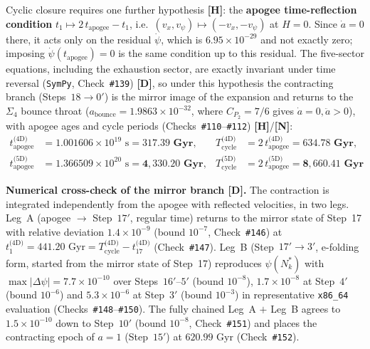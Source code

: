 \documentclass[11pt,a4paper]{article}
\newcommand{\catD}{\textbf{\textcolor{blue!75!black}{[D]}}}
\newcommand{\catH}{\textbf{\textcolor{orange!85!black}{[H]}}}
\newcommand{\catN}{\textbf{\textcolor{teal!75!black}{[N]}}}
\theoremstyle{plain}
\theoremstyle{definition}
\theoremstyle{remark}
\numberwithin{equation}{section}
\begin{document}
\begin{enumerate}
  Cyclic closure requires one further hypothesis \catH: the \textbf{apogee time-reflection condition} $t_1 \mapsto 2\,t_{\text{apogee}} - t_1$, i.e.\ $(v_x, v_{\psi}) \mapsto (-v_x, -v_{\psi})$ at $H = 0$. Since $\dot{a} = 0$ there, it acts only on the residual $\dot{\psi}$, which is $6.95 \times 10^{-29}$ and not exactly zero; imposing $\dot{\psi}(t_{\text{apogee}}) = 0$ is the same condition up to this residual. The five-sector equations, including the exhaustion sector, are exactly invariant under time reversal (\texttt{SymPy}, Check~\texttt{\#139}) \catD, so under this hypothesis the contracting branch (Steps~$18 \to 0'$) is the mirror image of the expansion and returns to the $\Sigma_4$ bounce throat ($a_{\text{bounce}} = 1.9863 \times 10^{-32}$, where $C_{P_2} = 7/6$ gives $\dot{a} = 0, \ddot{a} > 0$), with apogee ages and cycle periods (Checks~\texttt{\#110}--\texttt{\#112}) \catH/\catN:
  \begin{align}
    t_{\text{apogee}}^{\text{(4D)}} &= 1.001606 \times 10^{19}\text{ s} = \mathbf{317.39\text{ Gyr}}, & T_{\text{cycle}}^{\text{(4D)}} &= 2\,t_{\text{apogee}}^{\text{(4D)}} = \mathbf{634.78\text{ Gyr}}, \nonumber \\[4pt]
    t_{\text{apogee}}^{\text{(5D)}} &= 1.366509 \times 10^{20}\text{ s} = \mathbf{4{,}330.20\text{ Gyr}}, & T_{\text{cycle}}^{\text{(5D)}} &= 2\,t_{\text{apogee}}^{\text{(5D)}} = \mathbf{8{,}660.41\text{ Gyr}}
    \label{eq:exact_turnaround_time}
  \end{align}

  \textbf{Numerical cross-check of the mirror branch \catD.} The contraction is integrated independently from the apogee with reflected velocities, in two legs. Leg~A (apogee $\to$ Step~$17'$, regular time) returns to the mirror state of Step~17 with relative deviation $1.4 \times 10^{-9}$ (bound $10^{-7}$, Check~\texttt{\#146}) at $t_1^{\text{(4D)}} = 441.20\text{ Gyr} = T_{\text{cycle}}^{\text{(4D)}} - t_{17}^{\text{(4D)}}$ (Check~\texttt{\#147}). Leg~B (Step~$17' \to 3'$, e-folding form, started from the mirror state of Step~17) reproduces $\psi(N_k^*)$ with $\max|\Delta\psi| = 7.7 \times 10^{-10}$ over Steps~$16'$--$5'$ (bound $10^{-8}$), $1.7 \times 10^{-8}$ at Step~$4'$ (bound $10^{-6}$) and $5.3 \times 10^{-6}$ at Step~$3'$ (bound $10^{-3}$) in representative \texttt{x86\_64} evaluation (Checks~\texttt{\#148}--\texttt{\#150}). The fully chained Leg~A $+$ Leg~B agrees to $1.5 \times 10^{-10}$ down to Step~$10'$ (bound $10^{-8}$, Check~\texttt{\#151}) and places the contracting epoch of $a = 1$ (Step~$15'$) at $620.99\text{ Gyr}$ (Check~\texttt{\#152}).


\end{enumerate}
\end{document}

